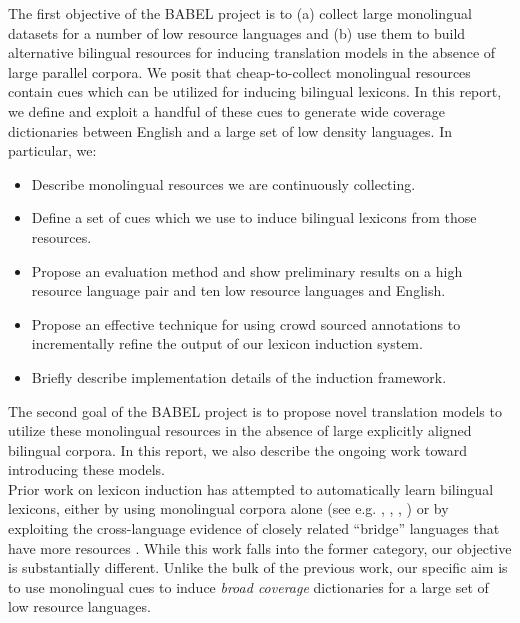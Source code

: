 \documentclass{article}
\begin{document}
The first objective of the BABEL project is to (a) collect large monolingual datasets for a number of low resource languages and (b) use them to build alternative bilingual resources for inducing translation models in the absence of large parallel corpora.  We posit that cheap-to-collect monolingual resources contain cues which can be utilized for inducing bilingual lexicons. In this report, we define and exploit a handful of these cues to generate wide coverage dictionaries between English and a large set of low density languages. In particular, we:

\begin{itemize}
 \item Describe monolingual resources we are continuously collecting.
 \item Define a set of cues which we use to induce bilingual lexicons from those resources.
 \item Propose an evaluation method and show preliminary results on a high resource language pair and ten low resource languages and English.
 \item Propose an effective technique for using crowd sourced annotations to incrementally refine the output of our lexicon induction system.
 \item Briefly describe implementation details of the induction framework.
\end{itemize}

The second goal of the BABEL project is to propose novel translation models to utilize these monolingual resources in the absence of large explicitly aligned bilingual corpora.  In this report, we also describe the ongoing work toward introducing these models.\\

Prior work on lexicon induction has attempted to automatically learn bilingual lexicons, either by using monolingual corpora alone (see e.g. \cite{Rapp:1999}, \cite{Koehn:2002}, \cite{Schafer:2002}, \cite{Haghighi:2008}) or by exploiting the cross-language evidence of closely related “bridge” languages that have more resources \cite{Mann:2001}.  While this work falls into the former category, our objective is substantially different.  Unlike the bulk of the previous work, our specific aim is to use monolingual cues to induce {\em broad coverage} dictionaries for a large set of low resource languages. 
\end{document}

